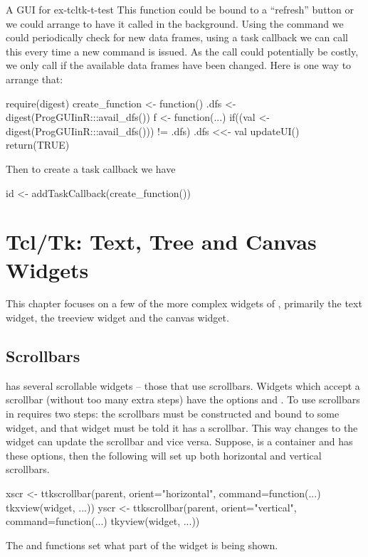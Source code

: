 \begin{example}{A GUI for }{ex-tcltk-t-test}
This function could be bound to a ``refresh'' button or we could
arrange to have it called in the background. Using the 
command we could periodically check for new data frames, using a
task callback we can call this every time a
new command is issued.  As the call could potentially be costly, we
only call if the available data frames have been changed. Here is one
way to arrange that:
\begin{Schunk}
\begin{Sinput}
 require(digest)
 create_function <- function() {
   .dfs <- digest(ProgGUIinR:::avail_dfs())
   f <- function(...) {
     if((val <- digest(ProgGUIinR:::avail_dfs())) != .dfs) {
       .dfs <<- val
       updateUI()
     }
     return(TRUE)
   }
 }
\end{Sinput}
\end{Schunk}
Then to create a task callback we have
\begin{Schunk}
\begin{Sinput}
 id <- addTaskCallback(create_function())
\end{Sinput}
\end{Schunk}

\end{example}


\chapter{Tcl/Tk: Text, Tree and Canvas Widgets}
\label{sec:tcltk:scrollable-widgets}
This chapter focuses on a few of the more complex widgets of \Tk,
primarily the text widget, the treeview widget and the canvas
widget.

\section{Scrollbars}
\label{sec:tcltk:scrollbars}

\TK\/ has several scrollable widgets -- those that use scrollbars.
Widgets which accept a scrollbar (without too many extra steps) have
the options  and .  To use
scrollbars in  requires two steps: the scrollbars must be
constructed and bound to some widget, and that widget must be told it
has a scrollbar. This way changes to the widget can update the
scrollbar and vice versa. Suppose,  is a container and
 has these options, then the following will set up both
horizontal and vertical scrollbars.
%
\begin{Schunk}
\begin{Sinput}
 xscr <- ttkscrollbar(parent, orient="horizontal",
                  command=function(...) tkxview(widget, ...))
 yscr <- ttkscrollbar(parent, orient="vertical",
                  command=function(...) tkyview(widget, ...))
\end{Sinput}
\end{Schunk}
%
The  and  functions set what part of the widget is being shown.

